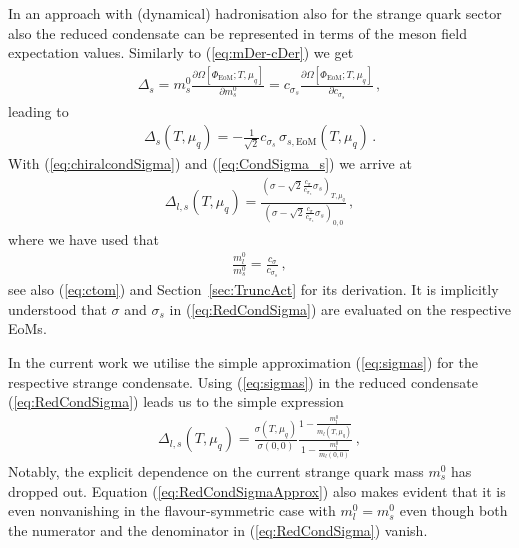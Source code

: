 \documentclass[%
reprint,
superscriptaddress,
showpacs,preprintnumbers,
 amsmath,amssymb,
 aps,
prd,
]{revtex4-1}
\def\Eq#1{Equation (\ref{#1})}
\def\eq#1{(\ref{#1})}
\def\sec#1{Section~\ref{#1}}
\begin{document}
In an approach with (dynamical) hadronisation also for the strange
quark sector also the reduced condensate can be represented in terms
of the meson field expectation values. Similarly to \eq{eq:mDer-cDer}
we get
%
\begin{align}\label{eq:mDer-cDer-s}
  \Delta_s =m_s^0\frac{\partial
  \Omega[\Phi_{\textrm{EoM}};T,\mu_q]}{\partial {m_s^0}}
  = c_{\sigma_s}
  \frac{\partial \Omega[\Phi_{\textrm{EoM}};T,
  \mu_q]}{ \partial {c_{\sigma_s}}}\,,
\end{align}
%
leading to 
%
\begin{align}\label{eq:CondSigma_s}
  \Delta_{s}(T,\mu_q) = -\frac{1}{\sqrt{2} }c_{\sigma_s}\,
  \sigma_{s,\textrm{EoM}}(T,\mu_q)\,. 
\end{align}
%
With \eq{eq:chiralcondSigma} and \eq{eq:CondSigma_s} we arrive at 
%
\begin{align}\label{eq:RedCondSigma}
  \Delta_{l,s}(T,\mu_q) = 
  \frac{\left(\sigma -\sqrt{2}\frac{c_\sigma}{c_{\sigma_s}}
  \sigma_s\right)_{T,\mu_q}}{
  \left(\sigma - \sqrt{2}\frac{c_\sigma}{c_{\sigma_s}}
  \sigma_s\right)_{0,0}}\,,  
\end{align}
%
where we have used that 
%
\begin{align}\label{eq:ctomApp}
  \frac{m_l^0}{m^0_s}= \frac{c_\sigma}{c_{\sigma_s}} \,, 
\end{align}
%
see also \eq{eq:ctom} and \sec{sec:TruncAct} for its derivation. It is
implicitly understood that $\sigma$ and $\sigma_s$ in
\eq{eq:RedCondSigma} are evaluated on the respective EoMs.

In the current work we utilise the simple approximation \eq{eq:sigmas}
for the respective strange condensate.  Using \eq{eq:sigmas} in the
reduced condensate \eq{eq:RedCondSigma} leads us to the simple
expression
%
%
\begin{align}\label{eq:RedCondSigmaApprox}
  \Delta_{l,s}(T,\mu_q) = 
  \frac{ \sigma(T,\mu_q) }{ \sigma(0,0) }
  \frac{ 1-\frac{m_l^0}{m_l(T,\mu_q)}}{
  1-\frac{m_l^0}{m_l(0,0)}}\,, 
\end{align}
%
Notably, the explicit dependence on the current strange quark mass
$m^0_s$ has dropped out. \Eq{eq:RedCondSigmaApprox} also makes evident
that it is even nonvanishing in the flavour-symmetric case with
$m_l^0=m_s^0$ even though both the numerator and the denominator in
\eq{eq:RedCondSigma} vanish.
\end{document}
